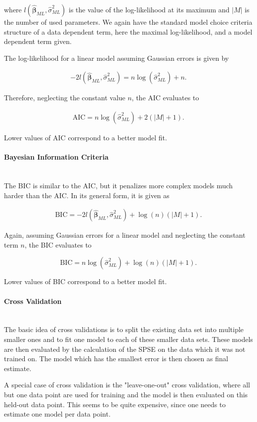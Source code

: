 \documentclass[10pt,a4paper]{article}
\newcommand{\subsubsubsection}[1]{\paragraph{#1}\mbox{}\\}
\begin{document}
where $l(\boldsymbol{\hat{\beta}}_{ML}, \hat \sigma^2_{ML})$ is the value of the log-likelihood at its maximum and $\vert M \vert$ is the number of used parameters. We again have the standard model choice criteria structure of a data dependent term, here the maximal log-likelihood, and a model dependent term given. 

The log-likelihood for a linear model assuming Gaussian errors is given by

\begin{align}
	-2l(\boldsymbol{\hat{\beta}}_{ML}, \hat \sigma_{ML}^2) = n \log(\hat \sigma_{ML}^2) + n.
\end{align}

Therefore, neglecting the constant value $n$, the AIC evaluates to

\begin{align}
	\text{AIC} = n \log(\hat \sigma^2_{ML}) + 2(\vert M \vert + 1).
\end{align}

Lower values of AIC correspond to a better model fit. \cite{fahrmeir2013regression}

\subsubsubsection{Bayesian Information Criteria}

The BIC is similar to the AIC, but it penalizes more complex models much harder than the AIC. In its general form, it is given as 

\begin{align}
	\text{BIC} = -2l(\boldsymbol{\hat{\beta}}_{ML}, \hat \sigma^2_{ML}) + \log(n) (\vert M \vert + 1).
\end{align}

Again, assuming Gaussian errors for a linear model and neglecting the constant term $n$, the BIC evaluates to

$$\text{BIC} = n\log(\hat \sigma_{ML}^2) + \log(n)(\vert M\vert + 1).$$

Lower values of BIC correspond to a better model fit. \cite{fahrmeir2013regression}

\subsubsubsection{Cross Validation}

The basic idea of cross validations is to split the existing data set into multiple smaller ones and to fit one model to each of these smaller data sets. These models are then evaluated by the calculation of the SPSE on the data which it was not trained on. The model which has the smallest error is then chosen as final estimate. 

A special case of cross validation is the "leave-one-out" cross validation, where all but one data point are used for training and the model is then evaluated on this held-out data point. This seems to be quite expensive, since one needs to estimate one model per data point. 
\end{document}
